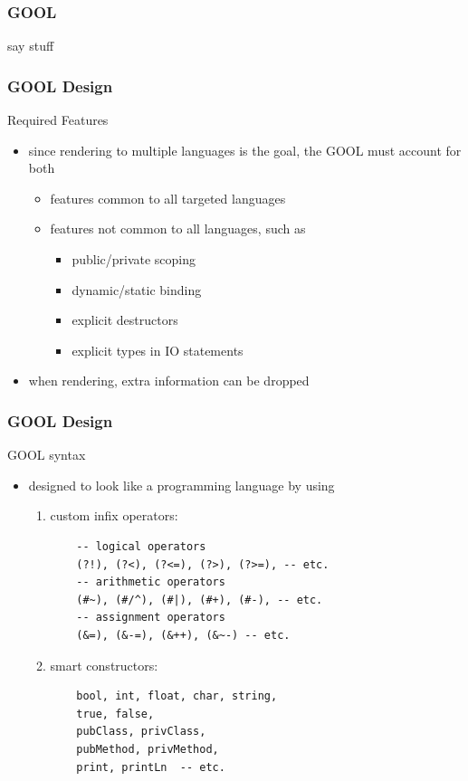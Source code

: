 \documentclass{beamer}
\begin{document}
\begin{frame}
\frametitle{GOOL}
say stuff
\end{frame}
\begin{frame}
\frametitle{GOOL Design}
{\Large Required Features}
\begin{itemize}
\item since rendering to multiple languages is the goal, the GOOL must account for both
\begin{itemize}
\item<2-> features common to all targeted languages
\item<3-> features not common to all languages, such as
\begin{itemize}
\item public/private scoping
\item dynamic/static binding
\item explicit destructors
\item explicit types in IO statements
\end{itemize}
\end{itemize}
\item<4-> when rendering, extra information can be dropped
\end{itemize}
\end{frame}

\begin{frame}
\frametitle{GOOL Design}
{\Large GOOL syntax}
\begin{itemize}
\item designed to look like a programming language by using
\begin{enumerate}
\item<2-> custom infix operators:
\begin{lstlisting}
    -- logical operators
    (?!), (?<), (?<=), (?>), (?>=), -- etc.
    -- arithmetic operators
    (#~), (#/^), (#|), (#+), (#-), -- etc.
    -- assignment operators
    (&=), (&-=), (&++), (&~-) -- etc.
\end{lstlisting}
\item<3-> smart constructors:
\begin{lstlisting}
    bool, int, float, char, string,
    true, false,
    pubClass, privClass, 
    pubMethod, privMethod,
    print, printLn  -- etc.
\end{lstlisting}
\end{enumerate}
\end{itemize}
\end{frame}
\end{document}
